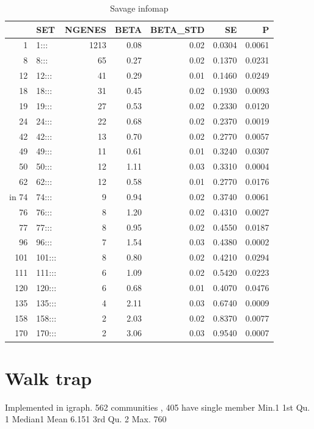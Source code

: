 \begin{table}[ht]
\centering
\begin{tabular}{rlrrrrr}
  \hline
 & SET & NGENES & BETA & BETA\_STD & SE & P \\ 
  \hline
1 & 1::: & 1213 & 0.08 & 0.02 & 0.0304 & 0.0061 \\ 
  8 & 8::: & 65 & 0.27 & 0.02 & 0.1370 & 0.0231 \\ 
  12 & 12::: & 41 & 0.29 & 0.01 & 0.1460 & 0.0249 \\ 
  18 & 18::: & 31 & 0.45 & 0.02 & 0.1930 & 0.0093 \\ 
  19 & 19::: & 27 & 0.53 & 0.02 & 0.2330 & 0.0120 \\ 
  24 & 24::: & 22 & 0.68 & 0.02 & 0.2370 & 0.0019 \\ 
  42 & 42::: & 13 & 0.70 & 0.02 & 0.2770 & 0.0057 \\ 
  49 & 49::: & 11 & 0.61 & 0.01 & 0.3240 & 0.0307 \\ 
  50 & 50::: & 12 & 1.11 & 0.03 & 0.3310 & 0.0004 \\ 
  62 & 62::: & 12 & 0.58 & 0.01 & 0.2770 & 0.0176 \\ in
  74 & 74::: &  9 & 0.94 & 0.02 & 0.3740 & 0.0061 \\ 
  76 & 76::: &  8 & 1.20 & 0.02 & 0.4310 & 0.0027 \\ 
  77 & 77::: &  8 & 0.95 & 0.02 & 0.4550 & 0.0187 \\ 
  96 & 96::: &  7 & 1.54 & 0.03 & 0.4380 & 0.0002 \\ 
  101 & 101::: &  8 & 0.80 & 0.02 & 0.4210 & 0.0294 \\ 
  111 & 111::: &  6 & 1.09 & 0.02 & 0.5420 & 0.0223 \\ 
  120 & 120::: &  6 & 0.68 & 0.01 & 0.4070 & 0.0476 \\ 
  135 & 135::: &  4 & 2.11 & 0.03 & 0.6740 & 0.0009 \\ 
  158 & 158::: &  2 & 2.03 & 0.02 & 0.8370 & 0.0077 \\ 
  170 & 170::: &  2 & 3.06 & 0.03 & 0.9540 & 0.0007 \\ 
   \hline
\end{tabular}
\caption{Savage infomap}
\label{tab:Infomap savage}
\end{table}

\section{Walk trap}
\label{sec:walk trap results}
Implemented in igraph. 562 communities , 405 have single member  Min.1 1st Qu.  1 Median1    Mean 6.151 3rd Qu. 2   Max. 760 
 
